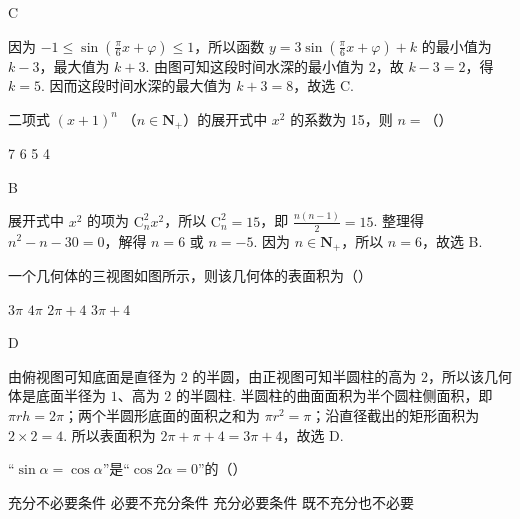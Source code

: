 \begin{answer}
C
\end{answer}

\begin{solution}
因为 \(-1\leqslant\sin\left(\frac{\pi}{6}x+\varphi\right)\leqslant1\)，所以函数 \(y=3\sin\left(\frac{\pi}{6}x+\varphi\right)+k\) 的最小值为 \(k-3\)，最大值为 \(k+3\). 由图可知这段时间水深的最小值为 \(2\)，故 \(k-3=2\)，得 \(k=5\). 因而这段时间水深的最大值为 \(k+3=8\)，故选 C.
\end{solution}

\begin{problem}
二项式 \((x + 1)^n\) （\(n \in \mathbf{N}_+\)）的展开式中 \(x^2\) 的系数为 15，则 \(n =\)（\quad）

\choices
    {7}
    {6}
    {5}
    {4}
\end{problem}

\begin{answer}
B
\end{answer}

\begin{solution}
展开式中 \(x^{2}\) 的项为 \(\mathrm C_n^2x^{2}\)，所以 \(\mathrm C_n^2=15\)，即
\(\frac{n(n-1)}{2}=15\). 整理得 \(n^{2}-n-30=0\)，解得 \(n=6\) 或 \(n=-5\). 因为 \(n\in\mathbf N_{+}\)，所以 \(n=6\)，故选 B.
\end{solution}

\begin{problem}
一个几何体的三视图如图所示，则该几何体的表面积为（\quad）


\choices
    {\(3 \pi\)}
    {\(4 \pi\)}
    {\(2 \pi + 4\)}
    {\(3 \pi + 4\)}
\end{problem}

\begin{answer}
D
\end{answer}

\begin{solution}
由俯视图可知底面是直径为 \(2\) 的半圆，由正视图可知半圆柱的高为 \(2\)，所以该几何体是底面半径为 \(1\)、高为 \(2\) 的半圆柱. 半圆柱的曲面面积为半个圆柱侧面积，即 \(\pi r h=2\pi\)；两个半圆形底面的面积之和为 \(\pi r^{2}=\pi\)；沿直径截出的矩形面积为 \(2\times2=4\). 所以表面积为 \(2\pi+\pi+4=3\pi+4\)，故选 D.
\end{solution}

\begin{problem}
“\(\sin \alpha = \cos \alpha\)”是“\(\cos 2\alpha = 0\)”的（\quad）

\choices
    {充分不必要条件}
    {必要不充分条件}
    {充分必要条件}
    {既不充分也不必要}
\end{problem}

